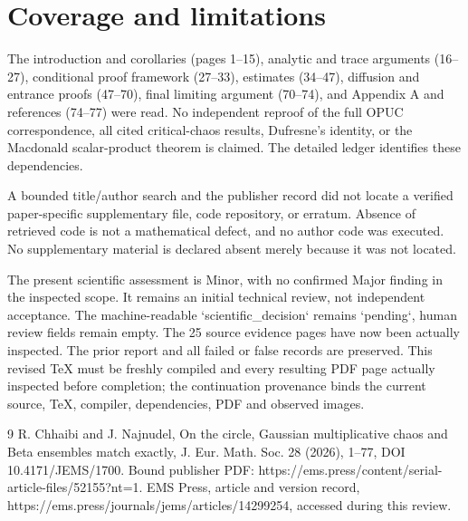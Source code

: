 \documentclass[10pt]{article}
\begin{document}
\section*{Coverage and limitations}
The introduction and corollaries (pages 1–15), analytic and trace arguments (16–27), conditional proof framework (27–33), estimates (34–47), diffusion and entrance proofs (47–70), final limiting argument (70–74), and Appendix A and references (74–77) were read. No independent reproof of the full OPUC correspondence, all cited critical-chaos results, Dufresne’s identity, or the Macdonald scalar-product theorem is claimed. The detailed ledger identifies these dependencies.\par
A bounded title/author search and the publisher record did not locate a verified paper-specific supplementary file, code repository, or erratum. Absence of retrieved code is not a mathematical defect, and no author code was executed. No supplementary material is declared absent merely because it was not located.\par
The present scientific assessment is Minor, with no confirmed Major finding in the inspected scope. It remains an initial technical review, not independent acceptance. The machine-readable `scientific\_decision` remains `pending`, human review fields remain empty. The 25 source evidence pages have now been actually inspected. The prior report and all failed or false records are preserved. This revised TeX must be freshly compiled and every resulting PDF page actually inspected before completion; the continuation provenance binds the current source, TeX, compiler, dependencies, PDF and observed images.\par
9 R. Chhaibi and J. Najnudel, On the circle, Gaussian multiplicative chaos and Beta ensembles match exactly, J. Eur. Math. Soc. 28 (2026), 1–77, DOI 10.4171/JEMS/1700. Bound publisher PDF: https://ems.press/content/serial-article-files/52155?nt=1. EMS Press, article and version record, https://ems.press/journals/jems/articles/14299254, accessed during this review.\par
\end{document}
